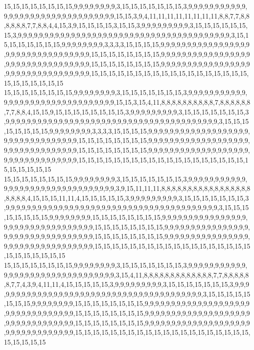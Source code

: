 15,15,15,15,15,15,15,15,9,9,9,9,9,9,9,9,3,15,15,15,15,15,15,15,3,9,9,9,9,9,9,9,9,9,9,9,9,9,9,9,9,9,9,9,9,9,9,9,9,9,9,9,9,9,9,9,9,15,15,3,9,4,11,11,11,11,11,11,11,11,8,8,7,7,8,8,8,8,8,8,7,7,8,8,4,4,15,3,9,15,15,15,15,3,15,15,3,9,9,9,9,9,9,9,9,9,3,15,15,15,15,15,15,15,3,9,9,9,9,9,9,9,9,9,9,9,9,9,9,9,9,9,9,9,9,9,9,9,9,9,9,9,9,9,9,9,9,9,9,9,9,9,9,9,9,3,15,15,15,15,15,15,15,15,9,9,9,9,9,9,9,9,3,3,3,3,15,15,15,15,9,9,9,9,9,9,9,9,9,9,9,9,9,9,9,9,9,9,9,9,9,9,9,9,9,9,9,9,9,9,9,9,9,15,15,15,15,15,15,15,15,9,9,9,9,9,9,9,9,9,9,9,9,9,9,9,9,9,9,9,9,9,9,9,9,9,9,9,9,9,9,9,9,9,15,15,15,15,15,15,15,15,9,9,9,9,9,9,9,9,9,9,9,9,9,9,9,9,9,9,9,9,9,9,9,9,9,9,9,9,9,9,9,9,9,15,15,15,15,15,15,15,15,15,15,15,15,15,15,15,15,15,15,15,15,15,15,15,15,15
15,15,15,15,15,15,15,15,9,9,9,9,9,9,9,9,3,15,15,15,15,15,15,15,3,9,9,9,9,9,9,9,9,9,9,9,9,9,9,9,9,9,9,9,9,9,9,9,9,9,9,9,9,9,9,9,9,15,15,3,15,4,11,8,8,8,8,8,8,8,8,8,8,7,8,8,8,8,8,8,7,7,8,8,4,15,15,9,15,15,15,15,15,15,15,15,3,9,9,9,9,9,9,9,9,9,3,15,15,15,15,15,15,15,3,9,9,9,9,9,9,9,9,9,9,9,9,9,9,9,9,9,9,9,9,9,9,9,9,9,9,9,9,9,9,9,9,9,9,9,9,9,9,9,9,3,15,15,15,15,15,15,15,15,9,9,9,9,9,9,9,9,3,3,3,3,15,15,15,15,9,9,9,9,9,9,9,9,9,9,9,9,9,9,9,9,9,9,9,9,9,9,9,9,9,9,9,9,9,9,9,9,9,15,15,15,15,15,15,15,15,9,9,9,9,9,9,9,9,9,9,9,9,9,9,9,9,9,9,9,9,9,9,9,9,9,9,9,9,9,9,9,9,9,15,15,15,15,15,15,15,15,9,9,9,9,9,9,9,9,9,9,9,9,9,9,9,9,9,9,9,9,9,9,9,9,9,9,9,9,9,9,9,9,9,15,15,15,15,15,15,15,15,15,15,15,15,15,15,15,15,15,15,15,15,15,15,15,15,15
15,15,15,15,15,15,15,15,9,9,9,9,9,9,9,9,3,15,15,15,15,15,15,15,3,9,9,9,9,9,9,9,9,9,9,9,9,9,9,9,9,9,9,9,9,9,9,9,9,9,9,9,9,9,9,9,9,3,9,15,11,11,11,8,8,8,8,8,8,8,8,8,8,8,8,8,8,8,8,8,8,8,8,8,4,15,15,15,11,11,4,15,15,15,15,15,3,9,9,9,9,9,9,9,9,9,3,15,15,15,15,15,15,15,3,9,9,9,9,9,9,9,9,9,9,9,9,9,9,9,9,9,9,9,9,9,9,9,9,9,9,9,9,9,9,9,9,9,9,9,9,9,9,9,9,3,15,15,15,15,15,15,15,15,9,9,9,9,9,9,9,9,15,15,15,15,15,15,15,15,9,9,9,9,9,9,9,9,9,9,9,9,9,9,9,9,9,9,9,9,9,9,9,9,9,9,9,9,9,9,9,9,9,15,15,15,15,15,15,15,15,9,9,9,9,9,9,9,9,9,9,9,9,9,9,9,9,9,9,9,9,9,9,9,9,9,9,9,9,9,9,9,9,9,15,15,15,15,15,15,15,15,9,9,9,9,9,9,9,9,9,9,9,9,9,9,9,9,9,9,9,9,9,9,9,9,9,9,9,9,9,9,9,9,9,15,15,15,15,15,15,15,15,15,15,15,15,15,15,15,15,15,15,15,15,15,15,15,15,15
15,15,15,15,15,15,15,15,9,9,9,9,9,9,9,9,3,15,15,15,15,15,15,15,3,9,9,9,9,9,9,9,9,9,9,9,9,9,9,9,9,9,9,9,9,9,9,9,9,9,9,9,9,9,9,9,9,3,15,4,11,8,8,8,8,8,8,8,8,8,8,8,8,8,7,7,8,8,8,8,8,8,7,7,4,3,9,4,11,11,4,15,15,15,15,15,3,9,9,9,9,9,9,9,9,9,3,15,15,15,15,15,15,15,3,9,9,9,9,9,9,9,9,9,9,9,9,9,9,9,9,9,9,9,9,9,9,9,9,9,9,9,9,9,9,9,9,9,9,9,9,9,9,9,9,3,15,15,15,15,15,15,15,15,9,9,9,9,9,9,9,9,15,15,15,15,15,15,15,15,9,9,9,9,9,9,9,9,9,9,9,9,9,9,9,9,9,9,9,9,9,9,9,9,9,9,9,9,9,9,9,9,9,15,15,15,15,15,15,15,15,9,9,9,9,9,9,9,9,9,9,9,9,9,9,9,9,9,9,9,9,9,9,9,9,9,9,9,9,9,9,9,9,9,15,15,15,15,15,15,15,15,9,9,9,9,9,9,9,9,9,9,9,9,9,9,9,9,9,9,9,9,9,9,9,9,9,9,9,9,9,9,9,9,9,15,15,15,15,15,15,15,15,15,15,15,15,15,15,15,15,15,15,15,15,15,15,15,15,15
